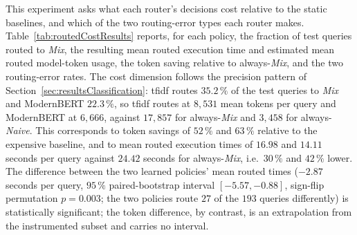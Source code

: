 \documentclass[english, bibtex]{kththesis}               %
\numberwithin{listing}{chapter}
\begin{document}
This experiment asks what each router's decisions cost relative to the static baselines, and which of the two routing-error types each router makes. Table~\ref{tab:routedCostResults} reports, for each policy, the fraction of test queries routed to \emph{Mix}, the resulting mean routed execution time and estimated mean routed model-token usage, the token saving relative to always-\emph{Mix}, and the two routing-error rates. The cost dimension follows the precision pattern of Section~\ref{sec:resultsClassification}: \gls{tfidf} routes $35.2\,\%$ of the test queries to \emph{Mix} and ModernBERT $22.3\,\%$, so \gls{tfidf} routes at $8{,}531$ mean tokens per query and ModernBERT at $6{,}666$, against $17{,}857$ for always-\emph{Mix} and $3{,}458$ for always-\emph{Naive}. This corresponds to token savings of $52\,\%$ and $63\,\%$ relative to the expensive baseline, and to mean routed execution times of $16.98$ and $14.11$ seconds per query against $24.42$ seconds for always-\emph{Mix}, i.e.\ $30\,\%$ and $42\,\%$ lower. The difference between the two learned policies' mean routed times ($-2.87$ seconds per query, $95\,\%$ paired-bootstrap interval $[-5.57, -0.88]$, sign-flip permutation $p = 0.003$; the two policies route $27$ of the $193$ queries differently) is statistically significant; the token difference, by contrast, is an extrapolation from the instrumented subset and carries no interval.
\end{document}
